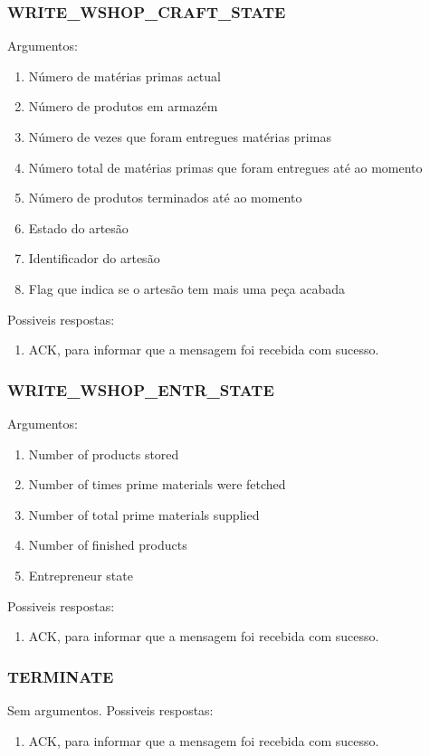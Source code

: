 \documentclass[11pt,a4paper]{report}
\begin{document}
\subsubsection{WRITE\_WSHOP\_CRAFT\_STATE}
Argumentos:
\begin{enumerate}
    \itemsep-0.4em
    \item Número de matérias primas actual
    \item Número de produtos em armazém
    \item Número de vezes que foram entregues matérias primas
    \item Número total de matérias primas que foram entregues até ao momento
    \item Número de produtos terminados até ao momento
    \item Estado do artesão
    \item Identificador do artesão
    \item Flag que indica se o artesão tem mais uma peça acabada
\end{enumerate}
Possiveis respostas:
\begin{enumerate}
    \itemsep-0.4em
    \item ACK, para informar que a mensagem foi recebida com sucesso.
\end{enumerate}

\subsubsection{WRITE\_WSHOP\_ENTR\_STATE}
Argumentos:
\begin{enumerate}
    \itemsep-0.4em
    \item Number of products stored
    \item Number of times prime materials were fetched
    \item Number of total prime materials supplied
    \item Number of finished products
    \item Entrepreneur state
\end{enumerate}
Possiveis respostas:
\begin{enumerate}
    \itemsep-0.4em
    \item ACK, para informar que a mensagem foi recebida com sucesso.
\end{enumerate}

\subsubsection{TERMINATE}
Sem argumentos.
Possiveis respostas: 
\begin{enumerate}
\itemsep-0.4em 
\item ACK, para informar que a mensagem foi recebida com sucesso.
\end{enumerate}
\end{document}
